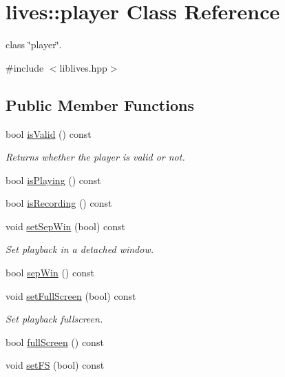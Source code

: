 \hypertarget{classlives_1_1player}{\section{lives\-:\-:player Class Reference}
\label{classlives_1_1player}
}


class \char`\"{}player\char`\"{}.  




{\ttfamily \#include $<$liblives.\-hpp$>$}

\subsection*{Public Member Functions}
\begin{DoxyCompactItemize}
\item 
bool \hyperlink{classlives_1_1player_a0902fd78a0c6b8018e1d505acabbfd68}{is\-Valid} () const 
\begin{DoxyCompactList}\small\item\em Returns whether the player is valid or not. \end{DoxyCompactList}\item 
bool \hyperlink{classlives_1_1player_a6a955179baa434a9b9d1b086dfd22ad8}{is\-Playing} () const 
\item 
bool \hyperlink{classlives_1_1player_a8d396bb07f1e4135298a7bd95c1332af}{is\-Recording} () const 
\item 
void \hyperlink{classlives_1_1player_ad1e1e3763f1fee6e52f990cf7bb062b9}{set\-Sep\-Win} (bool) const 
\begin{DoxyCompactList}\small\item\em Set playback in a detached window. \end{DoxyCompactList}\item 
bool \hyperlink{classlives_1_1player_ad803eb6e38e08d8dbaeccf9b1199da97}{sep\-Win} () const 
\item 
void \hyperlink{classlives_1_1player_a2a181f594e6c5d252088a907e8f6e7cc}{set\-Full\-Screen} (bool) const 
\begin{DoxyCompactList}\small\item\em Set playback fullscreen. \end{DoxyCompactList}\item 
bool \hyperlink{classlives_1_1player_ae7e2918547b97d96ac9ac2269bccadb7}{full\-Screen} () const 
\item 
void \hyperlink{classlives_1_1player_affee648f6367f5d84673003ead47e5ca}{set\-F\-S} (bool) const 

\end{DoxyCompactItemize}
